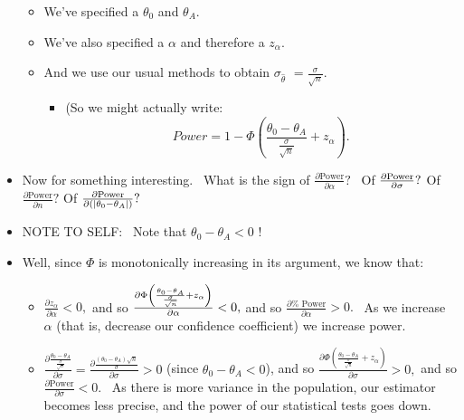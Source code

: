 \documentclass[11pt]{article}
\begin{document}
\begin{itemize}
\begin{itemize}
\item We've specified a $\theta _{0}$ and $\theta _{A}.$

\item We've also specified a $\alpha $ and therefore a $z_{\alpha }.$

\item And we use our usual methods to obtain $\sigma _{\widehat{\theta }}$ $=%
\frac{\sigma }{\sqrt{n}}.$

\begin{itemize}
\item (So we might actually write: \ 
\begin{equation*}
Power=1-\Phi \left( \frac{\theta _{0}-\theta _{A}}{\frac{\sigma }{\sqrt{n}}}%
+z_{\alpha }\right) .
\end{equation*}
\end{itemize}
\end{itemize}

\item Now for something interesting. \ What is the sign of $\frac{\partial 
\text{Power}}{\partial \alpha }?$ \ Of $\frac{\partial \text{Power}}{%
\partial \sigma }?$ Of $\frac{\partial \text{Power}}{\partial n}?$ Of $\frac{%
\partial \text{Power}}{\partial \left( \left\vert \theta _{0}-\theta
_{A}\right\vert \right) }?$

\item NOTE TO SELF: \ Note that $\theta _{0}-\theta _{A}<0$ !

\item Well, since $\Phi $ is monotonically increasing in its argument, we
know that:

\begin{itemize}
\item $\frac{\partial z_{\alpha }}{\partial \alpha }<0,$ and so $\frac{%
\partial \Phi \left( \frac{\theta _{0}-\theta _{A}}{\frac{\sigma }{\sqrt{n}}}%
+z_{\alpha }\right) }{\partial \alpha }<0,$ and so $\frac{\partial \text{%
Power}}{\partial \alpha }>0.$ \ As we increase $\alpha $ (that is, decrease
our confidence coefficient) we increase power.

\item $\frac{\partial \frac{\theta _{0}-\theta _{A}}{\frac{\sigma }{\sqrt{n}}%
}}{\partial \sigma }=\frac{\partial \frac{\left( \theta _{0}-\theta
_{A}\right) \sqrt{n}}{\sigma }}{\partial \sigma }>0$ (since $\theta
_{0}-\theta _{A}<0$), and so $\frac{\partial \Phi \left( \frac{\theta
_{0}-\theta _{A}}{\frac{\sigma }{\sqrt{n}}}+z_{\alpha }\right) }{\partial
\sigma }>0,$ and so $\frac{\partial \text{Power}}{\partial \sigma }<0.$ \ As
there is more variance in the population, our estimator becomes less
precise, and the power of our statistical tests goes down.


\end{itemize}
\end{itemize}
\end{document}
